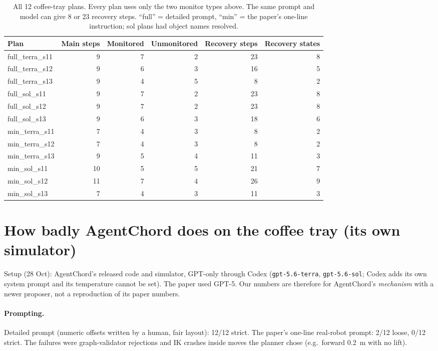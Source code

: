 \documentclass[11pt,a4paper]{article}
\begin{document}
\begin{table}[h]
\centering\footnotesize
\begin{tabular}{@{}lrrrrr@{}}
\toprule
Plan & Main steps & Monitored & Unmonitored & Recovery steps & Recovery states\\
\midrule
full\_terra\_s11 & 9 & 7 & 2 & 23 & 8\\
full\_terra\_s12 & 9 & 6 & 3 & 16 & 5\\
full\_terra\_s13 & 9 & 4 & 5 & 8 & 2\\
full\_sol\_s11 & 9 & 7 & 2 & 23 & 8\\
full\_sol\_s12 & 9 & 7 & 2 & 23 & 8\\
full\_sol\_s13 & 9 & 6 & 3 & 18 & 6\\
min\_terra\_s11 & 7 & 4 & 3 & 8 & 2\\
min\_terra\_s12 & 7 & 4 & 3 & 8 & 2\\
min\_terra\_s13 & 9 & 5 & 4 & 11 & 3\\
min\_sol\_s11 & 10 & 5 & 5 & 21 & 7\\
min\_sol\_s12 & 11 & 7 & 4 & 26 & 9\\
min\_sol\_s13 & 7 & 4 & 3 & 11 & 3\\
\bottomrule
\end{tabular}
\caption{All 12 coffee-tray plans. Every plan uses only the two monitor types above. The same prompt and model can give 8 or 23
recovery steps. ``full'' = detailed prompt, ``min'' = the paper's one-line instruction; sol plans had object names resolved.}
\end{table}

\section{How badly AgentChord does on the coffee tray (its own simulator)}
Setup (28 Oct): AgentChord's released code and simulator, GPT-only through Codex (\texttt{gpt-5.6-terra}, \texttt{gpt-5.6-sol};
Codex adds its own system prompt and its temperature cannot be set). The paper used GPT-5. Our numbers are therefore for
AgentChord's \emph{mechanism} with a newer proposer, not a reproduction of its paper numbers.

\paragraph{Prompting.} Detailed prompt (numeric offsets written by a human, fair layout): 12/12 strict. The paper's one-line
real-robot prompt: 2/12 loose, 0/12 strict. The failures were graph-validator rejections and IK crashes inside moves the
planner chose (e.g.\ forward 0.2~m with no lift).
\end{document}
